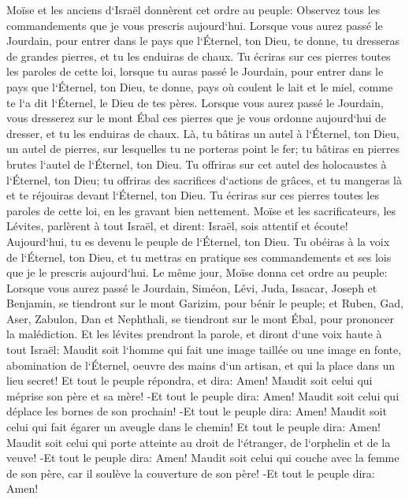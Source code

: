 \verse Moïse et les anciens d`Israël donnèrent cet ordre au peuple: Observez tous les commandements que je vous prescris aujourd`hui. 
\verse Lorsque vous aurez passé le Jourdain, pour entrer dans le pays que l`Éternel, ton Dieu, te donne, tu dresseras de grandes pierres, et tu les enduiras de chaux. 
\verse Tu écriras sur ces pierres toutes les paroles de cette loi, lorsque tu auras passé le Jourdain, pour entrer dans le pays que l`Éternel, ton Dieu, te donne, pays où coulent le lait et le miel, comme te l`a dit l`Éternel, le Dieu de tes pères. 
\verse Lorsque vous aurez passé le Jourdain, vous dresserez sur le mont Ébal ces pierres que je vous ordonne aujourd`hui de dresser, et tu les enduiras de chaux. 
\verse Là, tu bâtiras un autel à l`Éternel, ton Dieu, un autel de pierres, sur lesquelles tu ne porteras point le fer; 
\verse tu bâtiras en pierres brutes l`autel de l`Éternel, ton Dieu. Tu offriras sur cet autel des holocaustes à l`Éternel, ton Dieu; 
\verse tu offriras des sacrifices d`actions de grâces, et tu mangeras là et te réjouiras devant l`Éternel, ton Dieu. 
\verse Tu écriras sur ces pierres toutes les paroles de cette loi, en les gravant bien nettement. 
\verse Moïse et les sacrificateurs, les Lévites, parlèrent à tout Israël, et dirent: Israël, sois attentif et écoute! Aujourd`hui, tu es devenu le peuple de l`Éternel, ton Dieu. 
\verse Tu obéiras à la voix de l`Éternel, ton Dieu, et tu mettras en pratique ses commandements et ses lois que je le prescris aujourd`hui. 
\verse Le même jour, Moïse donna cet ordre au peuple: 
\verse Lorsque vous aurez passé le Jourdain, Siméon, Lévi, Juda, Issacar, Joseph et Benjamin, se tiendront sur le mont Garizim, pour bénir le peuple; 
\verse et Ruben, Gad, Aser, Zabulon, Dan et Nephthali, se tiendront sur le mont Ébal, pour prononcer la malédiction. 
\verse Et les lévites prendront la parole, et diront d`une voix haute à tout Israël: 
\verse Maudit soit l`homme qui fait une image taillée ou une image en fonte, abomination de l`Éternel, oeuvre des mains d`un artisan, et qui la place dans un lieu secret! Et tout le peuple répondra, et dira: Amen! 
\verse Maudit soit celui qui méprise son père et sa mère! -Et tout le peuple dira: Amen! 
\verse Maudit soit celui qui déplace les bornes de son prochain! -Et tout le peuple dira: Amen! 
\verse Maudit soit celui qui fait égarer un aveugle dans le chemin! Et tout le peuple dira: Amen! 
\verse Maudit soit celui qui porte atteinte au droit de l`étranger, de l`orphelin et de la veuve! -Et tout le peuple dira: Amen! 
\verse Maudit soit celui qui couche avec la femme de son père, car il soulève la couverture de son père! -Et tout le peuple dira: Amen! 
